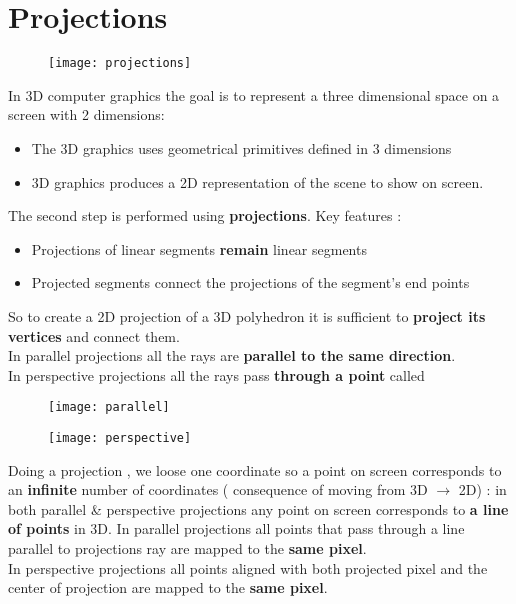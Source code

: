 \newpage
\section{Projections}
\begin{figure}[H]
  \centering
  \texttt{[image: projections]}
\end{figure}
In 3D computer graphics the goal is to represent a three dimensional space on a screen with 2 dimensions:
\begin{itemize}
\item The 3D graphics uses geometrical primitives defined in 3 dimensions
\item 3D graphics produces  a 2D representation of the scene to show on screen.
\end{itemize}
The second step is performed using \textbf{projections}.
Key features :
\begin{itemize}
\item Projections of linear segments \textbf{remain} linear segments 
\item Projected segments connect the projections of the segment's end points
\end{itemize}
So to create a 2D projection of a 3D polyhedron it is sufficient to \textbf{project its vertices} and connect them.\\
In parallel projections all the rays are \textbf{parallel to the same direction}.\\
In perspective projections all the rays pass \textbf{through a point} called \begin{figure}[H]
\begin{minipage}{.5\textwidth}
 \centering
  \texttt{[image: parallel]}
\end{minipage}%
	\begin{minipage}{.5\textwidth}
  \centering
  \texttt{[image: perspective]}
\end{minipage}%
\end{figure}
Doing a projection , we loose one coordinate so a point on screen corresponds to an \textbf{infinite} number of coordinates ( consequence of moving from 3D $\to$ 2D) : in both parallel \& perspective projections any point on screen corresponds to \textbf{a line of points} in 3D.
In parallel projections all points that pass	through a line parallel to projections ray are mapped to the \textbf{same pixel}.\\
In perspective projections all points aligned with both projected pixel and the center of projection are mapped to the \textbf{same pixel}.
